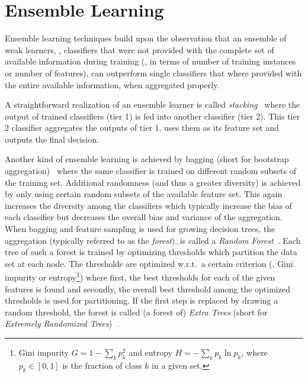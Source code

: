 \chapter{Ensemble Learning}
\label{chap:apdx_forest}
Ensemble learning techniques build upon the observation that an ensemble of weak learners, \ie{}, classifiers that were not provided with the complete set of available information during training (\eg{}, in terms of number of training instances or number of features), can outperform single classifiers that where provided with the entire available information, when aggregated properly.

A straightforward realization of an ensemble learner is called \textit{stacking}~\cite{stacking} where the output of trained classifiers (tier 1) is fed into another classifier (tier 2).
This tier 2 classifier aggregates the outputs of tier 1, uses them as its feature set and outputs the final decision.

Another kind of ensemble learning is achieved by bagging (short for bootstrap aggregation)~\cite{bagging} where the same classifier is trained on different random subsets of the training set.
Additional randomness (and thus a greater diversity) is achieved by only using certain random subsets of the available feature set.
This again increases the diversity among the classifiers which typically increase the bias of each classifier but decreases the overall bias and variance of the aggregation.
When bagging and feature sampling is used for growing decision trees, the aggregation (typically referred to as the \textit{forest}), is called a \textit{Random Forest}~\cite{rforest}.
Each tree of such a forest is trained by optimizing thresholds which partition the data set at each node.
The thresholds are optimized w.r.t.\ a certain criterion (\eg{}, Gini impurity or entropy\footnote{Gini impurity $G = 1 - \sum_k p_k^2$ and entropy $H = -\sum_k p_k \ln p_k$, where $p_k \in [0,1]$ is the fraction of class $k$ in a given set.}) where first, the best thresholds for each of the given features is found and secondly, the overall best threshold among the optimized thresholds is used for partitioning.
If the first step is replaced by drawing a random threshold, the forest is called (a forest of) \textit{Extra Trees} (short for \textit{Extremely Randomized Trees})~\cite{etrees}.

